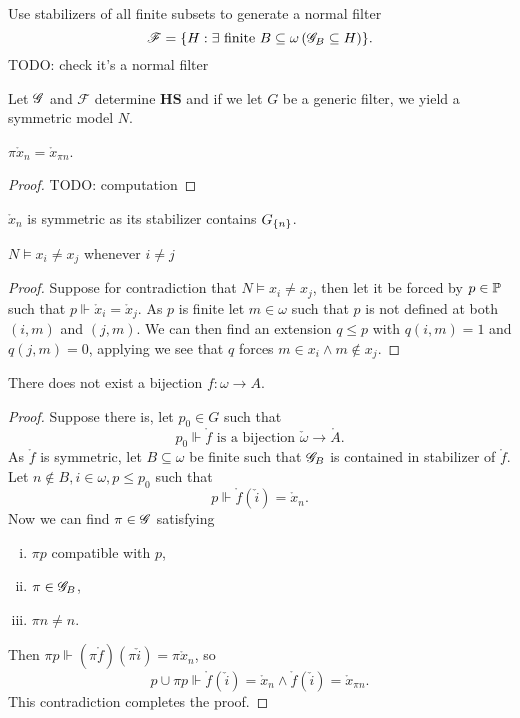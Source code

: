Use stabilizers of all finite subsets to generate a normal filter
\[ \mathscr{F} = \set{H: \exists \text{ finite } B\subseteq \omega \left(\G_B \subseteq H\right) }. \]
TODO: check it's a normal filter

Let \(\G\) and \(\mathscr{F}\) determine \(\mathbf{HS}\) and if we let \(G\) be a generic filter, we yield a symmetric model \(N\).

\begin{lemma}
    \(\pi \mathring{x}_n = \mathring{x}_{\pi n} \).
\end{lemma}
\begin{proof}
    TODO: computation
\end{proof}
\begin{corollary}
    \(\mathring{x}_n\) is symmetric as its stabilizer contains \(G_\set{n}\).
\end{corollary}

\begin{lemma}
    \(N\models x_i\ne x_j\) whenever \(i\ne j\)
\end{lemma}
\begin{proof}
    Suppose for contradiction that \(N\models x_i\ne x_j\),
    then let it be forced by \(p\in \P\) such that \(p\Vdash \mathring{x}_i = \mathring{x}_j\).
    As \(p\) is finite let \(m\in\omega\) such that \(p\) is not defined at both \((i,m)\) and \((j,m)\).
    We can then find an extension \(q\leq p\) with \(q(i,m) = 1\) and \(q(j,m) = 0\),
    applying 
    we see that \(q\) forces \(m\in x_i \land m\notin x_j\).
\end{proof}

\begin{lemma}
    There does not exist a bijection \(f:\omega\to A\).
\end{lemma}
\begin{proof}
Suppose there is, let \(p_0 \in G\) such that \[p_0\Vdash \mathring{f} \text{ is a bijection } \check{\omega}\to\mathring{A}. \]
As \(\mathring{f}\) is symmetric, let \(B\subseteq \omega\) be finite such that \(\G_B\) is contained in stabilizer of \(\mathring{f}\).
Let \(n\notin B, i\in\omega, p\leq p_0\) such that \[p\Vdash \mathring{f}(\check{i}) = \mathring{x}_n.\]
Now we can find \(\pi\in\G\) satisfying
\begin{enumerate}[i.]
    \item \(\pi p\) compatible with \(p\),
    \item \(\pi \in \G_B\),
    \item \(\pi n\ne n\).
\end{enumerate}
Then \(\pi p \Vdash (\pi \mathring{f})(\pi \check{i}) = \pi \mathring{x}_{n}\), so
\[p \cup \pi p \Vdash \mathring{f}(\check{i}) = \mathring{x}_n \land \mathring{f}(\check{i}) = \mathring{x}_{\pi n}. \]
This contradiction completes the proof.
\end{proof}


